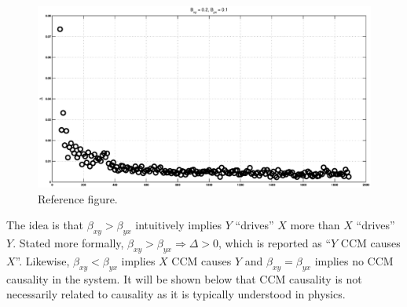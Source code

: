 \documentclass[a4paper,11pt]{article}
\begin{document}
\begin{figure}[ht]
\label{fig:}
\includegraphics[scale=0.45]{RefFigureA.eps}
\caption{Reference figure.}
\end{figure}

The idea is that $\beta_{xy}>\beta_{yx}$ intuitively implies $Y$ ``drives'' $X$ more than $X$ ``drives'' $Y$.  Stated more formally, $\beta_{xy}>\beta_{yx}\Rightarrow\Delta>0$, which is reported as ``$Y$ CCM causes $X$''.  Likewise, $\beta_{xy}<\beta_{yx}$ implies $X$ CCM causes $Y$ and $\beta_{xy}=\beta_{yx}$ implies no CCM causality in the system.  It will be shown below that CCM causality is not necessarily related to causality as it is typically understood in physics.
\end{document}
